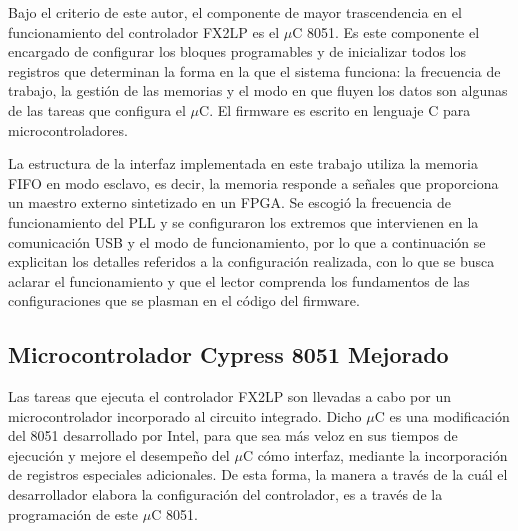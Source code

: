 %
%
%

Bajo el criterio de este autor, el componente de mayor trascendencia en el funcionamiento del controlador FX2LP es el $\mu$C 8051. Es este componente el encargado de configurar los bloques programables y de inicializar todos los registros que determinan la forma en la que el sistema funciona: la frecuencia de trabajo, la gestión de las memorias y el modo en que fluyen los datos son algunas de las tareas que configura el $\mu$C. El firmware es escrito en lenguaje C para microcontroladores. 

La estructura de la interfaz implementada en este trabajo utiliza la memoria FIFO en modo esclavo, es decir, la memoria responde a señales que proporciona un maestro externo sintetizado en un FPGA. Se escogió la frecuencia de funcionamiento del PLL y se configuraron los extremos que intervienen en la comunicación USB y el modo de funcionamiento, por lo que a continuación se explicitan los detalles referidos a la configuración realizada, con lo que se busca aclarar el funcionamiento y que el lector comprenda los fundamentos de las configuraciones que se plasman en el código del firmware.

\subsection{Microcontrolador Cypress 8051 Mejorado}
	Las tareas que ejecuta el controlador FX2LP son llevadas a cabo por un microcontrolador incorporado al circuito integrado. Dicho $\mu$C es una modificación del 8051 desarrollado por Intel, para que sea más veloz en sus tiempos de ejecución y mejore el desempeño del $\mu$C cómo interfaz, mediante la incorporación de registros especiales adicionales.  De esta forma, la manera a través de la cuál el desarrollador elabora la configuración del controlador, es a través de la programación de este $\mu$C 8051.
	
